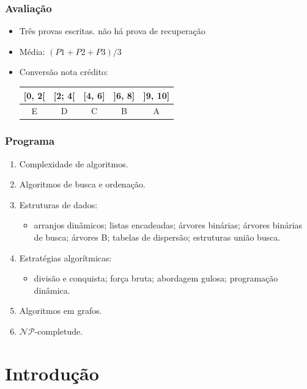\documentclass{beamer}
\begin{document}
\begin{frame}

  \frametitle{Avaliação}

  \begin{itemize}
    \item Três provas escritas. \alert{não há prova de recuperação}
    \item Média: $(P1 + P2 + P3)/3$
    \item Conversão nota crédito: 
      \begin{center}
      \begin{tabular}{c|c|c|c|c}
        [0, 2[ & [2; 4[ & [4, 6] & ]6, 8] & ]9, 10] \\
        \hline
        \hline
        E & D & C & B & A
      \end{tabular}
      \end{center}
  \end{itemize}
\end{frame}

\begin{frame}

  \frametitle{Programa}

  \begin{enumerate}
    \item Complexidade de algoritmos.
    \item Algoritmos de busca e ordenação.
    \item Estruturas de dados:
      \begin{itemize}
        \item arranjos dinâmicos; listas encadeadas; árvores binárias;
          árvores binárias de busca; árvores B; tabelas de dispersão;
          estruturas união busca.
      \end{itemize}
    \item Estratégias algorítmicas:
      \begin{itemize}
        \item divisão e conquista; força bruta; abordagem gulosa; programação dinâmica.
      \end{itemize}
    \item Algoritmos em grafos.
    \item $\mathcal{NP}$-completude.
  \end{enumerate}
\end{frame}

\section{Introdução}
\end{document}
